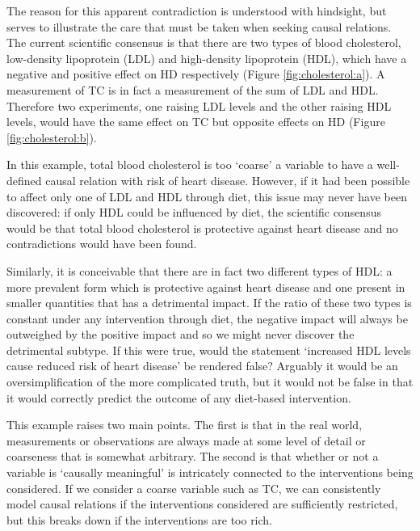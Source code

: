 The reason for this apparent contradiction is understood with hindsight, but serves to illustrate the care that must be taken when seeking causal relations. 
The current scientific consensus is that there are two types of blood cholesterol, low-density lipoprotein (LDL) and high-density lipoprotein (HDL), which have a negative and positive effect on HD respectively (Figure \ref{fig:cholesterol:a}).
A measurement of TC is in fact a measurement of the sum of LDL and HDL.
Therefore two experiments, one raising LDL levels and the other raising HDL levels, would have the same effect on TC but opposite effects on HD (Figure \ref{fig:cholesterol:b}).

In this example, total blood cholesterol is too `coarse' a variable to have a well-defined causal relation with risk of heart disease. 
However, if it had been possible to affect only one of LDL and HDL through diet, this issue may never have been discovered:
if only HDL could be influenced by diet, the scientific consensus would be that total blood cholesterol is protective against heart disease and no contradictions would have been found.

Similarly, it is conceivable that there are in fact two different types of HDL: a more prevalent form which is protective against heart disease and one present in smaller quantities that has a detrimental impact. 
If the ratio of these two types is constant under any intervention through diet, the negative impact will always be outweighed by the positive impact and so we might never discover the detrimental subtype. 
If this were true, would the statement `increased HDL levels cause reduced risk of heart disease' be rendered false? 
Arguably it would be an oversimplification of the more complicated truth, but it would not be false in that it would correctly predict the outcome of any diet-based intervention.

This example raises two main points. The first is that in the real world, measurements or observations are always made at some level of detail or coarseness that is somewhat arbitrary.
The second is that whether or not a variable is `causally meaningful' is intricately connected to the interventions being considered. If we consider a coarse variable such as TC, we can consistently model causal relations if the interventions considered are sufficiently restricted, but this breaks down if the interventions are too rich. 

